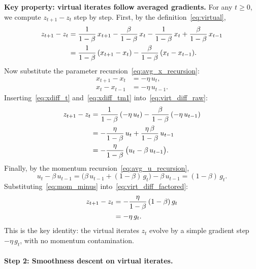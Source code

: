 \documentclass{article}
\begin{document}
\medskip
\noindent\textbf{Key property: virtual iterates follow averaged gradients.}
For any $t \geq 0$, we compute $z_{t+1} - z_t$ step by step.
First, by the definition~\eqref{eq:virtual},
\begin{align}
z_{t+1} - z_t
&= \frac{1}{1-\beta}\,x_{t+1} - \frac{\beta}{1-\beta}\,x_t
   - \frac{1}{1-\beta}\,x_t + \frac{\beta}{1-\beta}\,x_{t-1} \notag \\
&= \frac{1}{1-\beta}\,(x_{t+1} - x_t)
   - \frac{\beta}{1-\beta}\,(x_t - x_{t-1}).
\label{eq:virt_diff_raw}
\end{align}
Now substitute the parameter recursion~\eqref{eq:avg_x_recursion}:
\begin{align}
x_{t+1} - x_t &= -\eta\,u_t, \label{eq:xdiff_t} \\
x_t - x_{t-1}  &= -\eta\,u_{t-1}. \label{eq:xdiff_tm1}
\end{align}
Inserting~\eqref{eq:xdiff_t} and~\eqref{eq:xdiff_tm1}
into~\eqref{eq:virt_diff_raw}:
\begin{align}
z_{t+1} - z_t
&= \frac{1}{1-\beta}\,(-\eta\,u_t)
   - \frac{\beta}{1-\beta}\,(-\eta\,u_{t-1}) \notag \\
&= -\frac{\eta}{1-\beta}\,u_t
   + \frac{\eta\,\beta}{1-\beta}\,u_{t-1} \notag \\
&= -\frac{\eta}{1-\beta}\,
   \bigl(u_t - \beta\,u_{t-1}\bigr).
\label{eq:virt_diff_factored}
\end{align}
Finally, by the momentum recursion~\eqref{eq:avg_u_recursion},
\begin{equation}
u_t - \beta\,u_{t-1}
= \bigl(\beta\,u_{t-1} + (1-\beta)\,g_t\bigr) - \beta\,u_{t-1}
= (1-\beta)\,g_t.
\label{eq:mom_minus}
\end{equation}
Substituting~\eqref{eq:mom_minus} into~\eqref{eq:virt_diff_factored}:
\begin{align}
z_{t+1} - z_t
&= -\frac{\eta}{1-\beta}\,(1-\beta)\,g_t \notag \\
&= -\eta\,g_t.
\label{eq:virt_gradient}
\end{align}
This is the key identity: the virtual iterates $z_t$ evolve by a simple
gradient step $-\eta\,g_t$, with no momentum contamination.

\paragraph{Step 2: Smoothness descent on virtual iterates.}
\end{document}
